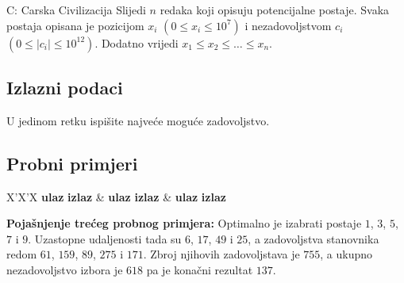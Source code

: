 \begin{statement}[
  timelimit=1 s,
  memorylimit=512 MiB,
]{C: Carska Civilizacija}
Slijedi $n$ redaka koji opisuju potencijalne postaje. Svaka postaja opisana je
pozicijom $x_i$ $(0 \le x_i \le 10^7)$ i nezadovoljstvom $c_i$ $(0 \le |c_i|
\le 10^{12})$. Dodatno vrijedi $x_1 \le x_2 \le \ldots \le x_n$.

\subsection*{Izlazni podaci}
U jedinom retku ispišite najveće moguće zadovoljstvo.

\subsection*{Probni primjeri}
\begin{tabularx}{\textwidth}{X'X'X}
  \textbf{ulaz}
  \linespread{1}{}
  \textbf{izlaz}
  \linespread{1}{} &
  \textbf{ulaz}
  \linespread{1}{}
  \textbf{izlaz}
  \linespread{1}{} &
  \textbf{ulaz}
  \linespread{1}{}
  \textbf{izlaz}
  \linespread{1}{}
\end{tabularx}

\textbf{Pojašnjenje trećeg probnog primjera:}
Optimalno je izabrati postaje $1$, $3$, $5$, $7$ i $9$.  Uzastopne udaljenosti
tada su $6$, $17$, $49$ i $25$, a zadovoljstva stanovnika redom $61$, $159$,
$89$, $275$ i $171$.  Zbroj njihovih zadovoljstava je $755$, a ukupno
nezadovoljstvo izbora je $618$ pa je konačni rezultat $137$.

\end{statement}

